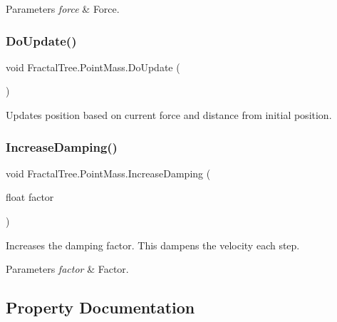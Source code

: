 \begin{DoxyParams}{Parameters}
{\em force} & Force.\\
\hline
\end{DoxyParams}
\hypertarget{class_fractal_tree_1_1_point_mass_a376cf6a1c55c15a5ff8c504af6cd1ed7}{}\label{class_fractal_tree_1_1_point_mass_a376cf6a1c55c15a5ff8c504af6cd1ed7} 
\subsubsection{\texorpdfstring{Do\+Update()}{DoUpdate()}}
{\footnotesize\ttfamily void Fractal\+Tree.\+Point\+Mass.\+Do\+Update (\begin{DoxyParamCaption}{ }\end{DoxyParamCaption})}



Updates position based on current force and distance from initial position. 

\hypertarget{class_fractal_tree_1_1_point_mass_aaade3e27a4d89806c8c1357b3c498898}{}\label{class_fractal_tree_1_1_point_mass_aaade3e27a4d89806c8c1357b3c498898} 
\subsubsection{\texorpdfstring{Increase\+Damping()}{IncreaseDamping()}}
{\footnotesize\ttfamily void Fractal\+Tree.\+Point\+Mass.\+Increase\+Damping (\begin{DoxyParamCaption}\item[{float}]{factor }\end{DoxyParamCaption})}



Increases the damping factor. This dampens the velocity each step. 


\begin{DoxyParams}{Parameters}
{\em factor} & Factor.\\
\hline
\end{DoxyParams}


\subsection{Property Documentation}
\hypertarget{class_fractal_tree_1_1_point_mass_a25ea2ddc370c2cf21b7f376bd8bb2cf6}{}\label{class_fractal_tree_1_1_point_mass_a25ea2ddc370c2cf21b7f376bd8bb2cf6} 
